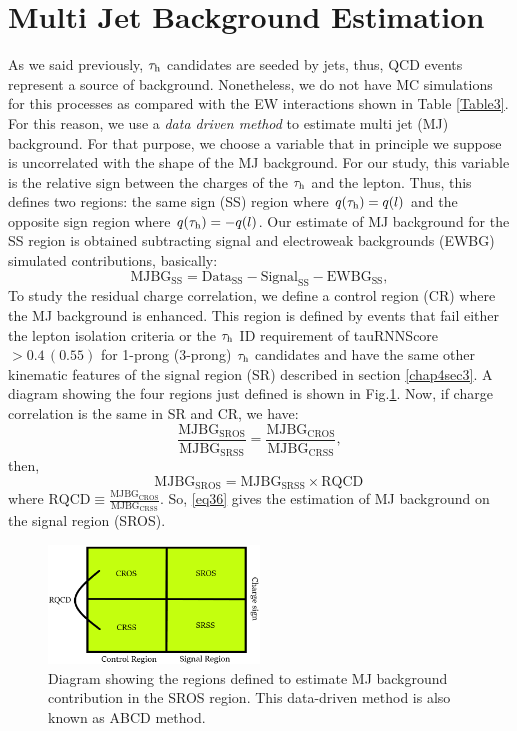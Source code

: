 \section{Multi Jet Background Estimation}
As we said previously, $\tau_\text{h}$ candidates are seeded by jets, thus, QCD events represent a source of background. Nonetheless, we do not have MC simulations for this processes as compared with the EW interactions shown in Table \ref{Table3}. For this reason, we use a \textit{data driven method} to estimate multi jet (MJ) background. For that purpose, we choose a variable that in principle we suppose is uncorrelated with the shape of the MJ background. For our study, this variable is the relative sign between the charges of the $\tau_\text{h}$ and the lepton. Thus, this defines two regions: the same sign (SS) region where $q(\tau_\text{h})=q(l)$ and the opposite sign region where $q(\tau_\text{h})=-q(l)$. Our estimate of MJ background for the SS region is obtained subtracting signal and electroweak backgrounds (EWBG) simulated contributions, basically:
\begin{equation}
\text{MJBG}_{\text{SS}}=\text{Data}_{\text{SS}}-\text{Signal}_{\text{SS}}-\text{EWBG}_{\text{SS}},
\end{equation}
 To study the residual charge correlation, we define a control region (CR) where the MJ background is enhanced. This region is defined by events that fail either the lepton isolation criteria or the $\tau_\text{h}$ ID requirement of tauRNNScore$>0.4\, (0.55)$ for 1-prong (3-prong) $\tau_\text{h}$ candidates and have the same other kinematic features of the signal region (SR) described in section \ref{chap4sec3}. A diagram showing the four regions just defined is shown in Fig.\ref{Fig13}. Now, if charge correlation is the same in SR and CR, we have:
 \begin{equation}
 \frac{\text{MJBG}_{\text{SROS}}}{\text{MJBG}_{\text{SRSS}}}=\frac{\text{MJBG}_{\text{CROS}}}{\text{MJBG}_{\text{CRSS}}},
 \end{equation}
then,
 \begin{equation}
\text{MJBG}_{\text{SROS}}=\text{MJBG}_{\text{SRSS}}\times \text{RQCD}\,
\label{eq36}
\end{equation}
where $\text{RQCD}\equiv\frac{\text{MJBG}_{\text{CROS}}}{\text{MJBG}_{\text{CRSS}}}$. So, \eqref{eq36} gives the estimation of MJ background on the signal region (SROS).
\begin{figure}[h]
	\centering
	\includegraphics[width=0.5\textwidth]{figures/Fig13}
	\caption{Diagram showing the regions defined to estimate MJ background contribution in the SROS region. This data-driven method is also known as ABCD method.}
	\label{Fig13}
\end{figure}
 